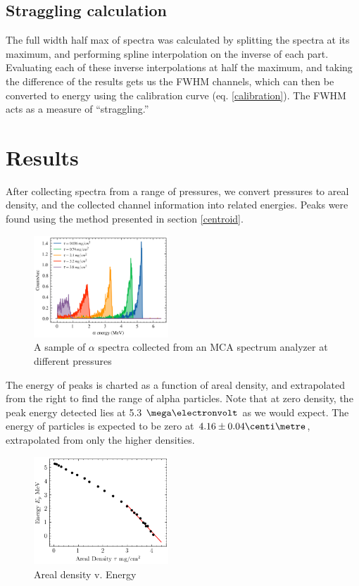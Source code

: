 \documentclass[12pt]{article}
\begin{document}
\begin{multicols}{2}
    \subsection{Straggling calculation}
    The full width half max of spectra was calculated by splitting the spectra at its maximum, and performing spline interpolation on the inverse of each part. Evaluating each of these inverse interpolations at half the maximum, and taking the difference of the results gets us the FWHM channels, which can then be converted to energy using the calibration curve (eq. \ref{calibration}). The FWHM acts as a measure of ``straggling.''

    \section{Results}

    After collecting spectra from a range of pressures, we convert pressures to areal density, and the collected channel information into related energies. Peaks were found using the method presented in section \ref{centroid}.
    \begin{figure}[H]
        \includegraphics[width=0.45\textwidth]{charts/spectra.png}
        \caption{A sample of $\alpha$ spectra collected from an MCA spectrum analyzer at different pressures}
    \end{figure}
    The energy of peaks is charted as a function of areal density, and extrapolated from the right to find the range of alpha particles. Note that at zero density, the peak energy detected lies at 5.3 $\mega \electronvolt$ as we would expect. The energy of particles is expected to be zero at $4.16 \pm 0.04 \centi \metre$, extrapolated from only the higher densities.
    \begin{figure}[H]
        \includegraphics[width=0.45\textwidth]{charts/Energy.png}
        \caption{Areal density v. Energy}
        \label{energy}
    \end{figure}


\end{multicols}
\end{document}
